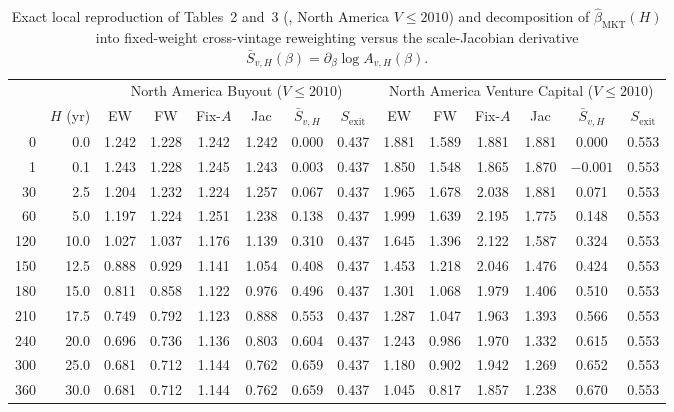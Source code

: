 \documentclass[11pt]{article}
\newcommand{\code}[1]{\texttt{\detokenize{#1}}}
\theoremstyle{plain}
\theoremstyle{definition}
\begin{document}
\begin{table}[htbp]
\centering
\small
\caption{Exact local reproduction of Tables~2 and~3 (\code{sdf_paper.tex}, North America $V\le 2010$) and decomposition of $\hat\beta_{\mathrm{MKT}}(H)$ into fixed-weight cross-vintage reweighting versus the scale-Jacobian derivative $\bar S_{v,H}(\beta)=\partial_\beta\log A_{v,H}(\beta)$.}
\label{tab:na_decomp}
\begin{tabular}{@{}rr cccc cc cccc cc@{}}
\toprule
& & \multicolumn{6}{c}{North America Buyout ($V\le 2010$)} & \multicolumn{6}{c}{North America Venture Capital ($V\le 2010$)}\\
\cmidrule(lr){3-8}\cmidrule(lr){9-14}
\code{max\_m} & $H$ (yr) & EW & FW & Fix-$A$ & Jac & $\bar S_{v,H}$ & $S_{\mathrm{exit}}$ & EW & FW & Fix-$A$ & Jac & $\bar S_{v,H}$ & $S_{\mathrm{exit}}$\\
\midrule
  0 &  0.0 & 1.242 & 1.228 & 1.242 & 1.242 & 0.000 & 0.437 & 1.881 & 1.589 & 1.881 & 1.881 &  0.000 & 0.553\\
  1 &  0.1 & 1.243 & 1.228 & 1.245 & 1.243 & 0.003 & 0.437 & 1.850 & 1.548 & 1.865 & 1.870 & $-0.001$ & 0.553\\
 30 &  2.5 & 1.204 & 1.232 & 1.224 & 1.257 & 0.067 & 0.437 & 1.965 & 1.678 & 2.038 & 1.881 &  0.071 & 0.553\\
 60 &  5.0 & 1.197 & 1.224 & 1.251 & 1.238 & 0.138 & 0.437 & 1.999 & 1.639 & 2.195 & 1.775 &  0.148 & 0.553\\
120 & 10.0 & 1.027 & 1.037 & 1.176 & 1.139 & 0.310 & 0.437 & 1.645 & 1.396 & 2.122 & 1.587 &  0.324 & 0.553\\
150 & 12.5 & 0.888 & 0.929 & 1.141 & 1.054 & 0.408 & 0.437 & 1.453 & 1.218 & 2.046 & 1.476 &  0.424 & 0.553\\
180 & 15.0 & 0.811 & 0.858 & 1.122 & 0.976 & 0.496 & 0.437 & 1.301 & 1.068 & 1.979 & 1.406 &  0.510 & 0.553\\
210 & 17.5 & 0.749 & 0.792 & 1.123 & 0.888 & 0.553 & 0.437 & 1.287 & 1.047 & 1.963 & 1.393 &  0.566 & 0.553\\
240 & 20.0 & 0.696 & 0.736 & 1.136 & 0.803 & 0.604 & 0.437 & 1.243 & 0.986 & 1.970 & 1.332 &  0.615 & 0.553\\
300 & 25.0 & 0.681 & 0.712 & 1.144 & 0.762 & 0.659 & 0.437 & 1.180 & 0.902 & 1.942 & 1.269 &  0.652 & 0.553\\
360 & 30.0 & 0.681 & 0.712 & 1.144 & 0.762 & 0.659 & 0.437 & 1.045 & 0.817 & 1.857 & 1.238 &  0.670 & 0.553\\
\bottomrule
\end{tabular}
\end{table}
\end{document}
